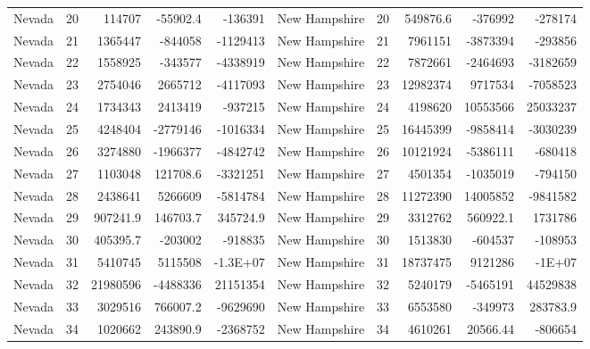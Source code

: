 \begin{landscape}
\begin{singlespace}
\begin{longtable}{lrrrr|lrrrr}
		Nevada &  20 & 114707 & -55902.4 & -136391 & New Hampshire &  20 & 549876.6 & -376992 & -278174 \\
		Nevada &  21 & 1365447 & -844058 & -1129413 & New Hampshire &  21 & 7961151 & -3873394 & -293856 \\
		Nevada &  22 & 1558925 & -343577 & -4338919 & New Hampshire &  22 & 7872661 & -2464693 & -3182659 \\
		Nevada &  23 & 2754046 & 2665712 & -4117093 & New Hampshire &  23 & 12982374 & 9717534 & -7058523 \\
		Nevada &  24 & 1734343 & 2413419 & -937215 & New Hampshire &  24 & 4198620 & 10553566 & 25033237 \\
		Nevada &  25 & 4248404 & -2779146 & -1016334 & New Hampshire &  25 & 16445399 & -9858414 & -3030239 \\
		Nevada &  26 & 3274880 & -1966377 & -4842742 & New Hampshire &  26 & 10121924 & -5386111 & -680418 \\
		Nevada &  27 & 1103048 & 121708.6 & -3321251 & New Hampshire &  27 & 4501354 & -1035019 & -794150 \\
		Nevada &  28 & 2438641 & 5266609 & -5814784 & New Hampshire &  28 & 11272390 & 14005852 & -9841582 \\
		Nevada &  29 & 907241.9 & 146703.7 & 345724.9 & New Hampshire &  29 & 3312762 & 560922.1 & 1731786 \\
		Nevada &  30 & 405395.7 & -203002 & -918835 & New Hampshire &  30 & 1513830 & -604537 & -108953 \\
		Nevada &  31 & 5410745 & 5115508 & -1.3E+07 & New Hampshire &  31 & 18737475 & 9121286 & -1E+07 \\
		Nevada &  32 & 21980596 & -4488336 & 21151354 & New Hampshire &  32 & 5240179 & -5465191 & 44529838 \\
		Nevada &  33 & 3029516 & 766007.2 & -9629690 & New Hampshire &  33 & 6553580 & -349973 & 283783.9 \\
		Nevada &  34 & 1020662 & 243890.9 & -2368752 & New Hampshire &  34 & 4610261 & 20566.44 & -806654\\


\end{longtable}
\end{singlespace}
\end{landscape}
